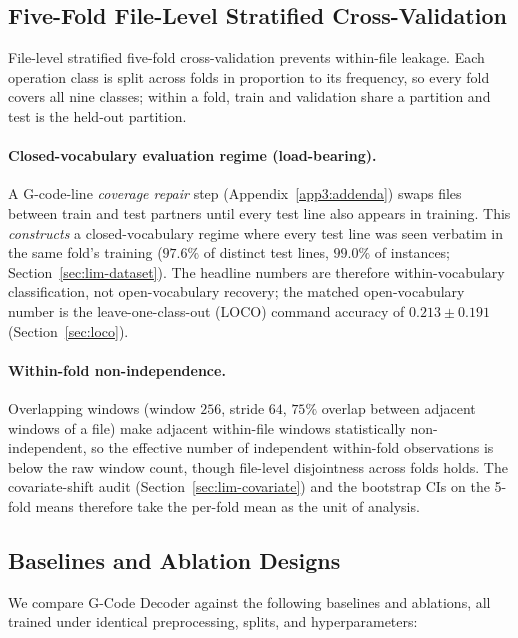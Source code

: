 \documentclass[sensors,article,submit,moreauthors,pdftex]{Definitions/mdpi}
\newcommand{\modelname}{G-Code Decoder}
\begin{document}
\subsection{Five-Fold File-Level Stratified Cross-Validation}
\label{sec:cv}

File-level stratified five-fold cross-validation prevents within-file leakage. Each operation class is split across folds in proportion to its frequency, so every fold covers all nine classes; within a fold, train and validation share a partition and test is the held-out partition.

\paragraph{Closed-vocabulary evaluation regime (load-bearing).} A G-code-line \emph{coverage repair} step (Appendix~\ref{app3:addenda}) swaps files between train and test partners until every test line also appears in training. This \emph{constructs} a closed-vocabulary regime where every test line was seen verbatim in the same fold's training ($97.6\%$ of distinct test lines, $99.0\%$ of instances; Section~\ref{sec:lim-dataset}). The headline numbers are therefore within-vocabulary classification, not open-vocabulary recovery; the matched open-vocabulary number is the leave-one-class-out (LOCO) command accuracy of $0.213 \pm 0.191$ (Section~\ref{sec:loco}).

\paragraph{Within-fold non-independence.} Overlapping windows (window $256$, stride $64$, $75\%$ overlap between adjacent windows of a file) make adjacent within-file windows statistically non-independent, so the effective number of independent within-fold observations is below the raw window count, though file-level disjointness across folds holds. The covariate-shift audit (Section~\ref{sec:lim-covariate}) and the bootstrap CIs on the 5-fold means therefore take the per-fold mean as the unit of analysis.

\subsection{Baselines and Ablation Designs}
\label{sec:ablations-design}

We compare \modelname{} against the following baselines and ablations, all trained under identical preprocessing, splits, and hyperparameters:
\end{document}
